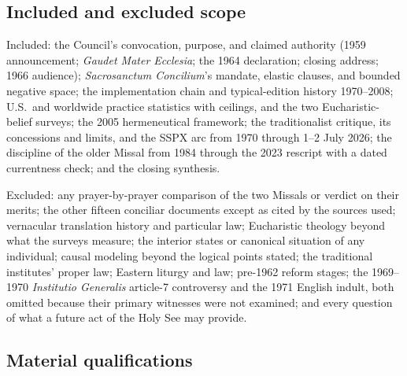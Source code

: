 \subsection{Included and excluded scope}

Included: the Council's convocation, purpose, and claimed authority (1959 announcement; \emph{Gaudet Mater Ecclesia}; the 1964 declaration; closing address; 1966 audience); \emph{Sacrosanctum Concilium}'s mandate, elastic clauses, and bounded negative space; the implementation chain and typical-edition history 1970--2008; U.S.\ and worldwide practice statistics with ceilings, and the two Eucharistic-belief surveys; the 2005 hermeneutical framework; the traditionalist critique, its concessions and limits, and the SSPX arc from 1970 through 1--2 July 2026; the discipline of the older Missal from 1984 through the 2023 rescript with a dated currentness check; and the closing synthesis.

Excluded: any prayer-by-prayer comparison of the two Missals or verdict on their merits; the other fifteen conciliar documents except as cited by the sources used; vernacular translation history and particular law; Eucharistic theology beyond what the surveys measure; the interior states or canonical situation of any individual; causal modeling beyond the logical points stated; the traditional institutes' proper law; Eastern liturgy and law; pre-1962 reform stages; the 1969--1970 \emph{Institutio Generalis} article-7 controversy and the 1971 English indult, both omitted because their primary witnesses were not examined; and every question of what a future act of the Holy See may provide.

\subsection{Material qualifications}


